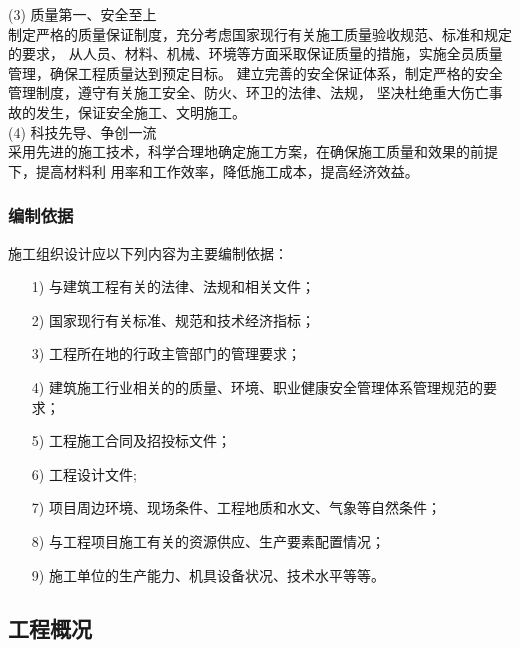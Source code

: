 (3) 质量第一、安全至上\\

制定严格的质量保证制度，充分考虑国家现行有关施工质量验收规范、标准和规定的要求，
从人员、材料、机械、环境等方面采取保证质量的措施，实施全员质量管理，确保工程质量达到预定目标。
建立完善的安全保证体系，制定严格的安全管理制度，遵守有关施工安全、防火、环卫的法律、法规，
坚决杜绝重大伤亡事故的发生，保证安全施工、文明施工。\\

(4) 科技先导、争创一流\\

采用先进的施工技术，科学合理地确定施工方案，在确保施工质量和效果的前提下，提高材料利
用率和工作效率，降低施工成本，提高经济效益。

\subsubsection{编制依据}

施工组织设计应以下列内容为主要编制依据：

\begin{itemize}

    \item [1)] 与建筑工程有关的法律、法规和相关文件；

    \item [2)] 国家现行有关标准、规范和技术经济指标；

    \item [3)] 工程所在地的行政主管部门的管理要求；

    \item [4)] 建筑施工行业相关的的质量、环境、职业健康安全管理体系管理规范的要求；

    \item [5)] 工程施工合同及招投标文件；

    \item [6)] 工程设计文件;

    \item [7)] 项目周边环境、现场条件、工程地质和水文、气象等自然条件；

    \item [8)] 与工程项目施工有关的资源供应、生产要素配置情况；

    \item [9)] 施工单位的生产能力、机具设备状况、技术水平等等。
    
\end{itemize}

\subsection{工程概况}
